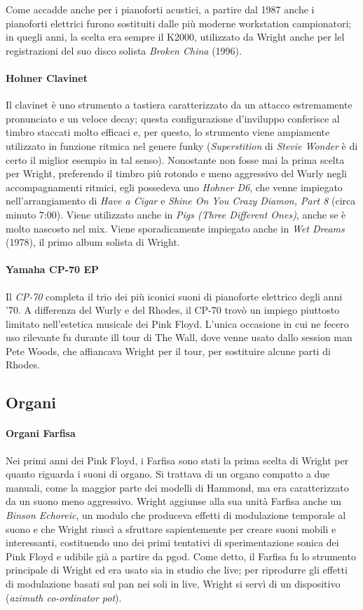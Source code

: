 \documentclass[class=book, crop=false, oneside, 12pt]{standalone}
\begin{document}
    Come accadde anche per i pianoforti acustici, a partire dal 1987 anche i pianoforti elettrici furono sostituiti dalle più moderne workstation campionatori; in quegli anni, la scelta era sempre il K2000, utilizzato da Wright anche per lel registrazioni del suo disco solista \emph{Broken China} (1996).

    \paragraph{Hohner Clavinet}
    Il clavinet è uno strumento a tastiera caratterizzato da un attacco estremamente pronunciato e un veloce decay; questa configurazione d'inviluppo conferisce al timbro staccati molto efficaci e, per questo, lo strumento viene ampiamente utilizzato in funzione ritmica nel genere funky (\emph{Superstition} di \emph{Stevie Wonder} è di certo il miglior esempio in tal senso). Nonostante non fosse mai la prima scelta per Wright, preferendo il timbro più rotondo e meno aggressivo del Wurly negli accompagnamenti ritmici, egli possedeva uno \emph{Hohner D6}, che venne impiegato nell'arrangiamento di \emph{Have a Cigar} e \emph{Shine On You Crazy Diamon, Part 8} (circa minuto 7:00). Viene utilizzato anche in \emph{Pigs (Three Different Ones)}, anche se è molto nascosto nel mix. Viene sporadicamente impiegato anche in \emph{Wet Dreams} (1978), il primo album solista di Wright.

    \paragraph{Yamaha CP-70 EP}
    Il \emph{CP-70} completa il trio dei più iconici suoni di pianoforte elettrico degli anni '70. A differenza del Wurly e del Rhodes, il CP-70 trovò un impiego piuttosto limitato nell'estetica musicale dei Pink Floyd. L'unica occasione in cui ne fecero uso rilevante fu durante ill tour di The Wall, dove venne usato dallo session man Pete Woods, che affiancava Wright per il tour, per sostituire alcune parti di Rhodes.

    \subsection{Organi}
    \paragraph{Organi Farfisa}
    Nei primi anni dei Pink Floyd, i Farfisa sono stati la prima scelta di Wright per quanto riguarda i suoni di organo. Si trattava di un organo compatto a due manuali, come la maggior parte dei modelli di Hammond, ma era caratterizzato da un suono meno aggressivo. Wright aggiunse alla sua unità Farfisa anche un \emph{Binson Echoreic}, un modulo che produceva effetti di modulazione temporale al suono e che Wright riuscì a sfruttare sapientemente per creare suoni mobili e interessanti, costituendo uno dei primi tentativi di sperimentazione sonica dei Pink Floyd e udibile già a partire da \acrshort{pgod}. Come detto, il Farfisa fu lo strumento principale di Wright ed era usato sia in studio che live; per riprodurre gli effetti di modulazione basati sul pan nei soli in live, Wright si servì di un dispositivo (\emph{azimuth co-ordinator pot}).
\end{document}

